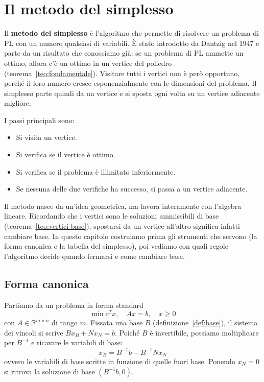 \chapter{Il metodo del simplesso}\label{ch:simplesso}
Il \textbf{metodo del simplesso} è l'algoritmo che permette di risolvere un problema di PL con un numero qualsiasi di variabili. È stato introdotto da Dantzig nel 1947 e parte da un risultato che conosciamo già: se un problema di PL ammette un ottimo, allora c'è un ottimo in un vertice del poliedro (teorema~\ref{teo:fondamentale}). Visitare tutti i vertici non è però opportuno, perché il loro numero cresce esponenzialmente con le dimensioni del problema. Il simplesso parte quindi da un vertice e si sposta ogni volta su un vertice adiacente migliore.

I passi principali sono:
\begin{itemize}
    \item Si visita un vertice.
    \item Si verifica se il vertice è ottimo.
    \item Si verifica se il problema è illimitato inferiormente.
    \item Se nessuna delle due verifiche ha successo, si passa a un vertice adiacente.
\end{itemize}

Il metodo nasce da un'idea geometrica, ma lavora interamente con l'algebra lineare. Ricordando che i vertici sono le soluzioni ammissibili di base (teorema~\ref{teo:vertici-base}), spostarsi da un vertice all'altro significa infatti cambiare base. In questo capitolo costruiamo prima gli strumenti che servono (la forma canonica e la tabella del simplesso), poi vediamo con quali regole l'algoritmo decide quando fermarsi e come cambiare base.

\section{Forma canonica}\label{sec:canonica}
Partiamo da un problema in forma standard
\[
\min c^T x, \quad A x = b, \quad x \ge 0
\]
con $A \in \mathbb{R}^{m \times n}$ di rango $m$. Fissata una base $B$ (definizione~\ref{def:base}), il sistema dei vincoli si scrive $B x_B + N x_N = b$. Poiché $B$ è invertibile, possiamo moltiplicare per $B^{-1}$ e ricavare le variabili di base:
\begin{equation}\label{eq:xb}
x_B = B^{-1} b - B^{-1} N x_N
\end{equation}
ovvero le variabili di base scritte in funzione di quelle fuori base. Ponendo $x_N = 0$ si ritrova la soluzione di base $(B^{-1}b, 0)$.

